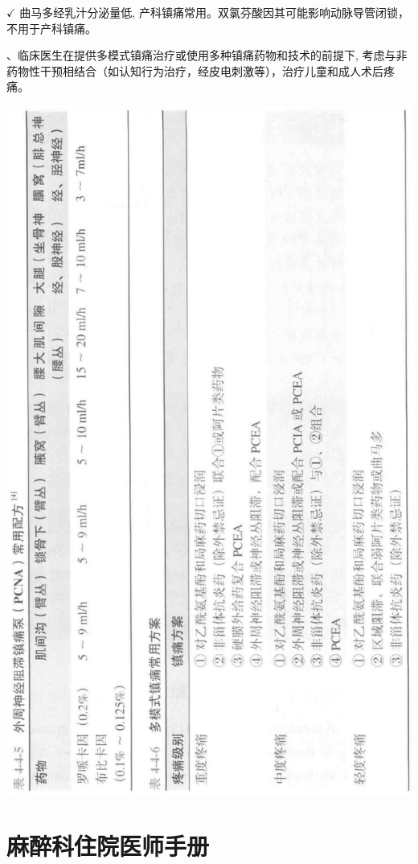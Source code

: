 \documentclass[10pt]{article}
\begin{document}
$\checkmark$ 曲马多经乳汁分泌量低, 产科镇痛常用。双氯芬酸因其可能影响动脉导管闭锁，不用于产科镇痛。

、临床医生在提供多模式镇痛治疗或使用多种镇痛药物和技术的前提下, 考虑与非药物性干预相结合（如认知行为治疗，经皮电刺激等），治疗儿童和成人术后疼痛。

\begin{center}
\includegraphics[max width=\textwidth]{2024_07_05_645bb794a4d4f32ee0c8g-279}
\end{center}

\section*{麻醉科住院医师手册}
\end{document}
